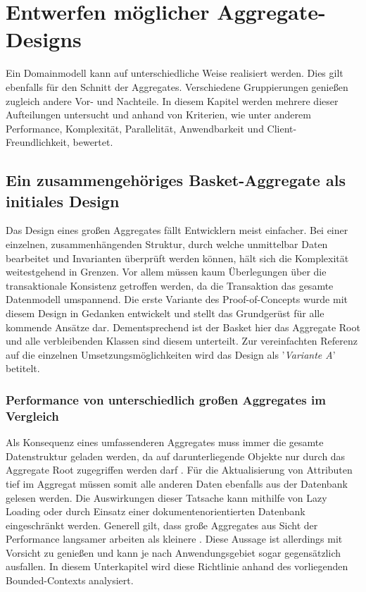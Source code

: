\chapter{Entwerfen möglicher Aggregate-Designs}

Ein Domainmodell kann auf unterschiedliche Weise realisiert werden. Dies gilt ebenfalls für den Schnitt der Aggregates. Verschiedene Gruppierungen genießen zugleich andere Vor- und Nachteile. In diesem Kapitel werden mehrere dieser Aufteilungen untersucht und anhand von Kriterien, wie unter anderem Performance, Komplexität, Parallelität, Anwendbarkeit und Client-Freundlichkeit, bewertet.

\section{Ein zusammengehöriges Basket-Aggregate als initiales Design}

Das Design eines großen Aggregates fällt Entwicklern meist einfacher. Bei einer einzelnen, zusammenhängenden Struktur, durch welche unmittelbar Daten bearbeitet und Invarianten überprüft werden können, hält sich die Komplexität weitestgehend in Grenzen. Vor allem müssen kaum Überlegungen über die transaktionale Konsistenz getroffen werden, da die Transaktion das gesamte Datenmodell umspannend. Die erste Variante des Proof-of-Concepts wurde mit diesem Design in Gedanken entwickelt und stellt das Grundgerüst für alle kommende Ansätze dar. Dementsprechend ist der Basket hier das Aggregate Root und alle verbleibenden Klassen sind diesem unterteilt. Zur vereinfachten Referenz auf die einzelnen Umsetzungsmöglichkeiten wird das Design als '\emph{Variante A}' betitelt.


\subsection{Performance von unterschiedlich großen Aggregates im Vergleich}

Als Konsequenz eines umfassenderen Aggregates muss immer die gesamte Datenstruktur geladen werden, da auf darunterliegende Objekte nur durch das Aggregate Root zugegriffen werden darf \cite[S. 128]{Evans.2011}. Für die Aktualisierung von Attributen tief im Aggregat müssen somit alle anderen Daten ebenfalls aus der Datenbank gelesen werden. Die Auswirkungen dieser Tatsache kann mithilfe von \gls{Lazy Loading} oder durch Einsatz einer dokumentenorientierten Datenbank eingeschränkt werden. Generell gilt, dass große Aggregates aus Sicht der Performance langsamer arbeiten als kleinere \cite[S. 355f.]{Vernon.2015}. Diese Aussage ist allerdings mit Vorsicht zu genießen und kann je nach Anwendungsgebiet sogar gegensätzlich ausfallen. In diesem Unterkapitel wird diese Richtlinie anhand des vorliegenden Bounded-Contexts analysiert.

